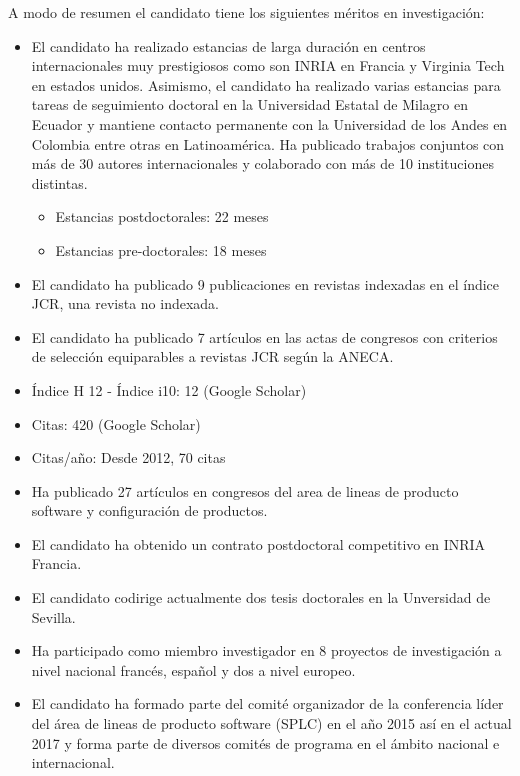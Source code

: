 A modo de resumen el candidato tiene los siguientes méritos en investigación:

\begin{itemize}
    \item El candidato ha realizado estancias de larga duración en centros internacionales muy prestigiosos como son INRIA en Francia y Virginia Tech en estados unidos. Asimismo, el candidato ha realizado varias estancias para tareas de seguimiento doctoral en la Universidad Estatal de Milagro en Ecuador y mantiene contacto permanente con la Universidad de los Andes en Colombia entre otras en Latinoamérica. Ha publicado trabajos conjuntos con más de 30 autores internacionales y colaborado con más de 10 instituciones distintas.  
    \begin{itemize}
        \item Estancias postdoctorales: 22 meses  
        \item Estancias pre-doctorales: 18 meses   
    \end{itemize}
\item El candidato ha publicado 9 publicaciones en revistas indexadas en el índice JCR, una revista no indexada.
\item El candidato ha publicado 7 artículos en las actas de congresos con criterios de selección equiparables a revistas JCR según la ANECA.   
\item Índice H 12 - Índice i10: 12  (Google Scholar)  
\item Citas: 420  (Google Scholar)  
\item Citas/año: Desde 2012, 70 citas    
\item Ha publicado 27 artículos en congresos del area de lineas de producto software y configuración de productos. 
\item El candidato ha obtenido un contrato postdoctoral competitivo en INRIA Francia. 
\item El candidato codirige actualmente dos tesis doctorales en la Unversidad de Sevilla. 
\item Ha participado como miembro investigador en 8 proyectos de investigación a nivel nacional francés, español y dos a nivel europeo.  
\item El candidato ha formado parte del comité organizador de la conferencia líder del área de lineas de producto software  (SPLC) en el año 2015 así en el actual 2017 y forma parte de diversos comités de programa en el ámbito nacional e internacional. 

\end{itemize}

    